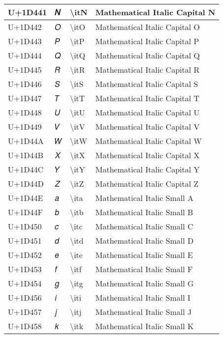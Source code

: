 \begin{table}[h]
\begin{tabulary}{\linewidth}{|L|L|L|L|}
\hline
U+1D441 & 𝑁 & {\textbackslash}itN & Mathematical Italic Capital N \\
\hline
U+1D442 & 𝑂 & {\textbackslash}itO & Mathematical Italic Capital O \\
\hline
U+1D443 & 𝑃 & {\textbackslash}itP & Mathematical Italic Capital P \\
\hline
U+1D444 & 𝑄 & {\textbackslash}itQ & Mathematical Italic Capital Q \\
\hline
U+1D445 & 𝑅 & {\textbackslash}itR & Mathematical Italic Capital R \\
\hline
U+1D446 & 𝑆 & {\textbackslash}itS & Mathematical Italic Capital S \\
\hline
U+1D447 & 𝑇 & {\textbackslash}itT & Mathematical Italic Capital T \\
\hline
U+1D448 & 𝑈 & {\textbackslash}itU & Mathematical Italic Capital U \\
\hline
U+1D449 & 𝑉 & {\textbackslash}itV & Mathematical Italic Capital V \\
\hline
U+1D44A & 𝑊 & {\textbackslash}itW & Mathematical Italic Capital W \\
\hline
U+1D44B & 𝑋 & {\textbackslash}itX & Mathematical Italic Capital X \\
\hline
U+1D44C & 𝑌 & {\textbackslash}itY & Mathematical Italic Capital Y \\
\hline
U+1D44D & 𝑍 & {\textbackslash}itZ & Mathematical Italic Capital Z \\
\hline
U+1D44E & 𝑎 & {\textbackslash}ita & Mathematical Italic Small A \\
\hline
U+1D44F & 𝑏 & {\textbackslash}itb & Mathematical Italic Small B \\
\hline
U+1D450 & 𝑐 & {\textbackslash}itc & Mathematical Italic Small C \\
\hline
U+1D451 & 𝑑 & {\textbackslash}itd & Mathematical Italic Small D \\
\hline
U+1D452 & 𝑒 & {\textbackslash}ite & Mathematical Italic Small E \\
\hline
U+1D453 & 𝑓 & {\textbackslash}itf & Mathematical Italic Small F \\
\hline
U+1D454 & 𝑔 & {\textbackslash}itg & Mathematical Italic Small G \\
\hline
U+1D456 & 𝑖 & {\textbackslash}iti & Mathematical Italic Small I \\
\hline
U+1D457 & 𝑗 & {\textbackslash}itj & Mathematical Italic Small J \\
\hline
U+1D458 & 𝑘 & {\textbackslash}itk & Mathematical Italic Small K \\

\end{tabulary}
\end{table}
